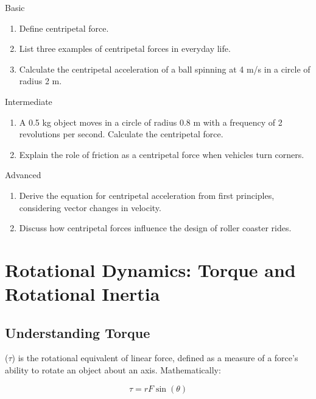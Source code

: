 \begin{tieredquestions}{Basic}
\begin{enumerate}
  \item Define centripetal force.
  \item List three examples of centripetal forces in everyday life.
  \item Calculate the centripetal acceleration of a ball spinning at 4 m/s in a circle of radius 2 m.
\end{enumerate}
\end{tieredquestions}

\begin{tieredquestions}{Intermediate}
\begin{enumerate}
  \item A 0.5 kg object moves in a circle of radius 0.8 m with a frequency of 2 revolutions per second. Calculate the centripetal force.
  \item Explain the role of friction as a centripetal force when vehicles turn corners.
\end{enumerate}
\end{tieredquestions}

\begin{tieredquestions}{Advanced}
\begin{enumerate}
  \item Derive the equation for centripetal acceleration from first principles, considering vector changes in velocity.
  \item Discuss how centripetal forces influence the design of roller coaster rides.
\end{enumerate}
\end{tieredquestions}

\FloatBarrier

\section{Rotational Dynamics: Torque and Rotational Inertia}
\FloatBarrier

\subsection{Understanding Torque}
\FloatBarrier

 (\(\tau\)) is the rotational equivalent of linear force, defined as a measure of a force's ability to rotate an object about an axis. Mathematically:

\[
\tau = rF \sin(\theta)
\]

